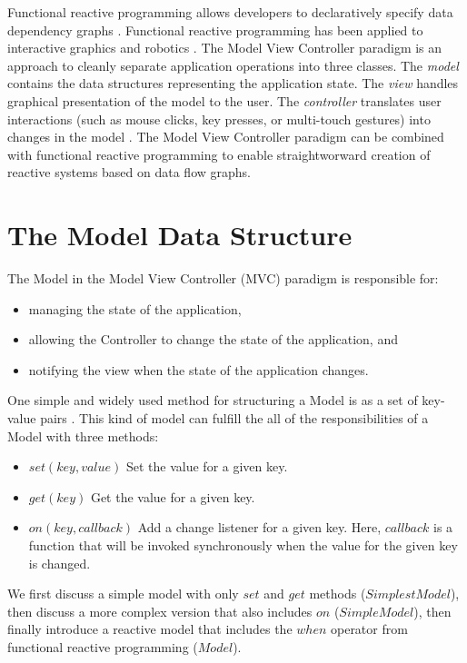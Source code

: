 Functional reactive programming allows developers to declaratively specify data dependency graphs \cite{wan2000functional}. Functional reactive programming has been applied to interactive graphics \cite{elliott1997functional} and robotics \cite{hudak2003arrows}. The Model View Controller paradigm is an approach to cleanly separate application operations into three classes. The \emph{model} contains the data structures representing the application state. The \emph{view} handles graphical presentation of the model to the user. The \emph{controller} translates user interactions (such as mouse clicks, key presses, or multi-touch gestures) into changes in the model \cite{krasner1988description}. The Model View Controller paradigm can be combined with functional reactive programming to enable straightworward creation of reactive systems based on data flow graphs.
\section{The Model Data Structure}
The Model in the Model View Controller (MVC) paradigm is responsible for:
\begin{itemize}
\item managing the state of the application,
\item allowing the Controller to change the state of the application, and 
\item notifying the view when the state of the application changes.
\end{itemize}

One simple and widely used method for structuring a Model is as a set of key-value pairs \cite{leff2001web}. This kind of model can fulfill the all of the responsibilities of a Model with three methods:

\begin{itemize}
\item $set(key, value)$ Set the value for a given key.
\item $get(key)$ Get the value for a given key.
\item $on(key, callback)$ Add a change listener for a given key. Here, $callback$ is a function that will be invoked synchronously when the value for the given key is changed.
\end{itemize}

We first discuss a simple model with only $set$ and $get$ methods ($SimplestModel$), then discuss a more complex version that also includes $on$ ($SimpleModel$), then finally introduce a reactive model that includes the $when$ operator from functional reactive programming ($Model$).
